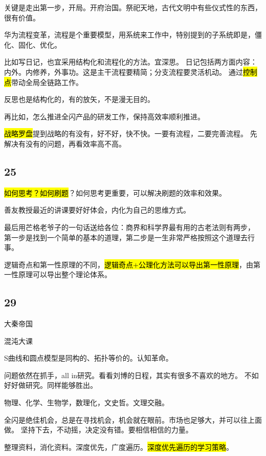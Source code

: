 关键是走出第一步，开局。开府治国。祭祀天地，古代文明中有些仪式性的东西，很有价值。

华为流程变革，流程是个重要模型，用系统来工作中，特别提到的子系统即是，僵化、固化、优化。

比如写日记，也宜采用结构化和流程化的方法。宜深思。
日记包括两方面内容：内外。内修养，外事功。这是主干流程要精简；分支流程要灵活机动。
通过\hl{控制点}带动全局全链路工作。

反思也是结构化的，有的放矢，不是漫无目的。

再比如，怎么推进全闪产品的研发工作，保持高效率顺利推进。

\hl{战略罗盘}提到战略的有没有，好不好，快不快。一要有流程，二要完善流程。
先解决有没有的问题，再看效率高不高。

\subsection{25}

\hl{如何思考？如何刷题}？如何思考更重要，可以解决刷题的效率和效果。

善友教授最近的讲课要好好体会，内化为自己的思维方式。

最后用芒格老爷子的一句话送给各位：商界和科学界最有用的古老法则有两步，
第一步是找到一个简单的基本的道理，第二步是一生非常严格按照这个道理去行事。

逻辑奇点和第一性原理的不同，\hl{逻辑奇点+公理化方法可以导出第一性原理}，由第一性原理可以导出整个理论体系。

\subsection{29}

大秦帝国

混沌大课

S曲线和圆点模型是同构的、拓扑等价的。认知革命。

问题依然在抓手，all in研究。看看刘博的日程，其实有很多不喜欢的地方。
不如好好做研究。同样能够胜出。

物理、化学、生物学，数理化，文史哲。文理交融。

\hrulefill

全闪是绝佳机会，总是在寻找机会，机会就在眼前。市场也足够大，并可以往上面做。
坚持下去，不动摇，决定没有错。要相信相信的力量。

整理资料，消化资料。深度优先，广度遍历。\hl{深度优先遍历的学习策略}。
